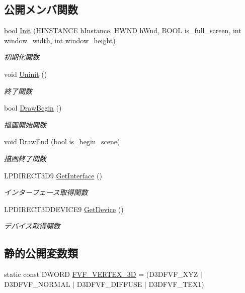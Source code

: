 \subsection*{公開メンバ関数}
\begin{DoxyCompactItemize}
\item 
bool \mbox{\hyperlink{class_renderer_direct_x9_a28da461025c48770a360b8d399a8414f}{Init}} (H\+I\+N\+S\+T\+A\+N\+CE h\+Instance, H\+W\+ND h\+Wnd, B\+O\+OL is\+\_\+full\+\_\+screen, int window\+\_\+width, int window\+\_\+height)
\begin{DoxyCompactList}\small\item\em 初期化関数 \end{DoxyCompactList}\item 
void \mbox{\hyperlink{class_renderer_direct_x9_a61c375254fc0a827873fb4c72181f0d5}{Uninit}} ()
\begin{DoxyCompactList}\small\item\em 終了関数 \end{DoxyCompactList}\item 
bool \mbox{\hyperlink{class_renderer_direct_x9_a61fc7dc142c3d54f83152fc3bb259ff4}{Draw\+Begin}} ()
\begin{DoxyCompactList}\small\item\em 描画開始関数 \end{DoxyCompactList}\item 
void \mbox{\hyperlink{class_renderer_direct_x9_a8a29b6e70fa8b2f55a12c11143184ce1}{Draw\+End}} (bool is\+\_\+begin\+\_\+scene)
\begin{DoxyCompactList}\small\item\em 描画終了関数 \end{DoxyCompactList}\item 
L\+P\+D\+I\+R\+E\+C\+T3\+D9 \mbox{\hyperlink{class_renderer_direct_x9_afa6521fe3ae4d5697687197cf5bf3c66}{Get\+Interface}} ()
\begin{DoxyCompactList}\small\item\em インターフェース取得関数 \end{DoxyCompactList}\item 
L\+P\+D\+I\+R\+E\+C\+T3\+D\+D\+E\+V\+I\+C\+E9 \mbox{\hyperlink{class_renderer_direct_x9_a718458c1493c7d6814e01847e2e4164d}{Get\+Device}} ()
\begin{DoxyCompactList}\small\item\em デバイス取得関数 \end{DoxyCompactList}\end{DoxyCompactItemize}
\subsection*{静的公開変数類}
\begin{DoxyCompactItemize}
\item 
static const D\+W\+O\+RD \mbox{\hyperlink{class_renderer_direct_x9_a80ce0089b01354986332553353625da6}{F\+V\+F\+\_\+\+V\+E\+R\+T\+E\+X\+\_\+3D}} = (D3\+D\+F\+V\+F\+\_\+\+X\+YZ $\vert$ D3\+D\+F\+V\+F\+\_\+\+N\+O\+R\+M\+AL $\vert$ D3\+D\+F\+V\+F\+\_\+\+D\+I\+F\+F\+U\+SE $\vert$ D3\+D\+F\+V\+F\+\_\+\+T\+E\+X1)
\end{DoxyCompactItemize}


